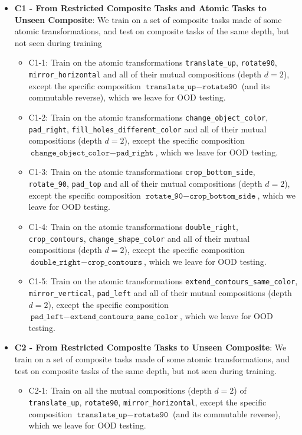 \begin{itemize}
    \item \textbf{C1 - From Restricted Composite Tasks and Atomic Tasks to Unseen Composite}: We train on a set of composite tasks made of some atomic transformations, and test on composite tasks of the same depth, but not seen during training
    \begin{itemize} 
        \item C1-1: Train on the atomic transformations \texttt{translate\_up}, \texttt{rotate90}, \texttt{mirror\_horizontal} and all of their mutual  compositions (depth $d=2$), except the specific  composition $\texttt{translate\_up} - \texttt{rotate90}$ (and its commutable reverse), which we leave for OOD testing.
        
        \item C1-2: Train on the atomic transformations \texttt{change\_object\_color}, \texttt{pad\_right}, \texttt{fill\_holes\_different\_color} and all of their mutual  compositions (depth $d=2$), except the specific  composition $\texttt{change\_object\_color} - \texttt{pad\_right}$, which we leave for OOD testing.
        
        \item C1-3: Train on the atomic transformations \texttt{crop\_bottom\_side}, \texttt{rotate\_90}, \texttt{pad\_top} and all of their mutual  compositions (depth $d=2$), except the specific  composition $\texttt{rotate\_90} - \texttt{crop\_bottom\_side}$, which we leave for OOD testing.

        \item C1-4: Train on the atomic transformations \texttt{double\_right}, \texttt{crop\_contours}, \texttt{change\_shape\_color} and all of their mutual compositions (depth $d=2$), except the specific  composition $\texttt{double\_right} - \texttt{crop\_contours}$, which we leave for OOD testing.
        
        \item C1-5: Train on the atomic transformations \texttt{extend\_contours\_same\_color}, \texttt{mirror\_vertical}, \texttt{pad\_left} and all of their mutual  compositions (depth $d=2$), except the specific  composition $\texttt{pad\_left} - \texttt{extend\_contours\_same\_color}$, which we leave for OOD testing.
    \end{itemize}
    
    \vspace{1em}
    \item \textbf{C2 - From Restricted Composite Tasks to Unseen Composite}:  
    We train on a set of composite tasks made of some atomic transformations, and test on composite tasks of the same depth, but not seen during training.
    \begin{itemize} 
        \item C2-1: Train on all the mutual compositions (depth $d=2$) of \texttt{translate\_up}, \texttt{rotate90}, \texttt{mirror\_horizontal}, except the specific  composition $\texttt{translate\_up} - \texttt{rotate90}$ (and its commutable reverse), which we leave for OOD testing.
        

\end{itemize}
\end{itemize}
